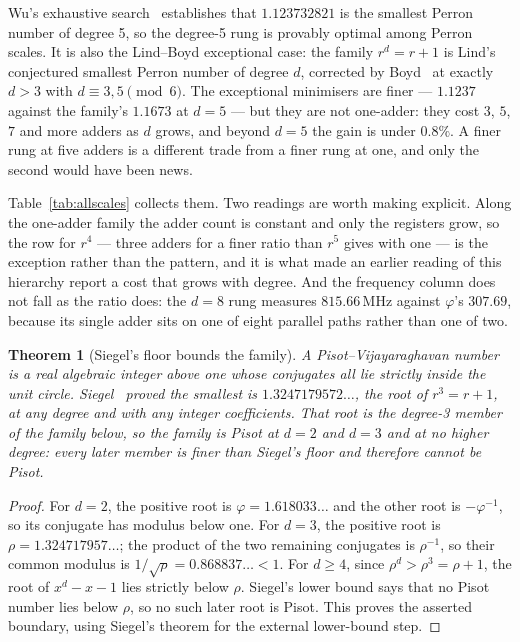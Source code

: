 \documentclass[11pt]{article}
\newtheorem{theorem}{Theorem}
\theoremstyle{definition}
\begin{document}
Wu's exhaustive search~\cite{wu2010} establishes that $1.123732821$ is the
smallest Perron number of degree 5, so the degree-5 rung is provably optimal
among Perron scales. It is also the Lind--Boyd exceptional case: the family
$r^d=r+1$ is Lind's conjectured smallest Perron number of degree $d$, corrected
by Boyd~\cite{boyd1985} at exactly $d>3$ with $d\equiv3,5 \pmod 6$. The
exceptional minimisers are finer --- $1.1237$ against the family's $1.1673$ at
$d=5$ --- but they are not one-adder: they cost $3$, $5$, $7$ and more adders as
$d$ grows, and beyond $d=5$ the gain is under $0.8\%$. A finer rung at five
adders is a different trade from a finer rung at one, and only the second would
have been news.

Table~\ref{tab:allscales} collects them. Two readings are worth making
explicit. Along the one-adder family the adder count is constant and only the
registers grow, so the row for $r^4$ --- three adders for a finer ratio than
$r^5$ gives with one --- is the exception rather than the pattern, and it is what
made an earlier reading of this hierarchy report a cost that grows with degree.
And the frequency column does not fall as the ratio does: the $d=8$ rung
measures $815.66$\,MHz against $\varphi$'s $307.69$, because its single adder
sits on one of eight parallel paths rather than one of two.

\begin{theorem}[Siegel's floor bounds the family]\label{thm:siegel}
A Pisot--Vijayaraghavan number is a real algebraic integer above one whose
conjugates all lie strictly inside the unit circle. Siegel~\cite{siegel1944}
proved the smallest is $1.3247179572\ldots$, the root of $r^3=r+1$, at any
degree and with any integer coefficients. That root is the degree-3 member of
the family below, so the family is Pisot at $d=2$ and $d=3$ and at no higher
degree: every later member is finer than Siegel's floor and therefore cannot be
Pisot.
\end{theorem}
\begin{proof}
For $d=2$, the positive root is $\varphi=1.618033\ldots$ and the other root is
$-\varphi^{-1}$, so its conjugate has modulus below one. For $d=3$, the
positive root is $\rho=1.324717957\ldots$; the product of the two remaining
conjugates is $\rho^{-1}$, so their common modulus is
$1/\sqrt{\rho}=0.868837\ldots<1$. For $d\ge4$, since
$\rho^d>\rho^3=\rho+1$, the root of $x^d-x-1$ lies strictly below $\rho$.
Siegel's lower bound says that no Pisot number lies below $\rho$, so no such
later root is Pisot. This proves the asserted boundary, using Siegel's theorem
for the external lower-bound step.
\end{proof}
\end{document}
